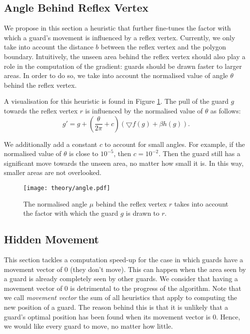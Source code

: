 \subsection{Angle Behind Reflex Vertex}
\label{sec:angle}
We propose in this section a heuristic that further fine-tunes the factor with which a guard's movement is influenced by a reflex vertex. Currently, we only take into account the distance $b$ between the reflex vertex and the polygon boundary. Intuitively, the unseen area behind the reflex vertex should also play a role in the computation of the gradient: guards should be drawn faster to larger areas. In order to do so, we  take into account the normalised value of angle $\theta$ behind the reflex vertex.

A visualisation for this heuristic is found in Figure \ref{fig:angle}. The pull of the guard $g$ towards the reflex vertex $r$ is influenced by the normalised value of $\theta$ as follows: $$g' = g + (\frac{\theta}{2\pi} + c)(\bigtriangledown f(g) + \beta h(g)).$$

We  additionally add a constant $c$ to account for small angles. For example, if the normalised value of $\theta$ is close to $10^{-5}$, then $c = 10^{-2}$. Then the guard still has a significant move towards the unseen area, no matter how small it is. In this way, smaller areas are not overlooked.

\begin{figure}[h!]
    \centering
    \texttt{[image: theory/angle.pdf]}
    \caption{The normalised angle $\mu$ behind the reflex vertex $r$ takes into account the factor with which the guard $g$ is drawn to $r$.}
    \label{fig:angle}
\end{figure}

\subsection{Hidden Movement}
\label{sec:hidden_gradient}
This section tackles a computation speed-up for the case in which guards have a movement vector of 0 (they don't move). This can happen when the area seen by a guard is already completely seen by other guards. We consider that having a movement vector of 0 is detrimental to the progress of the algorithm. Note that we call \textit{movement vector} the sum of all heuristics that apply to computing the new position of a guard. The reason behind this is that it is unlikely that a guard's optimal position has been found when its movement vector is 0. Hence, we would like every guard to move, no matter how little.

